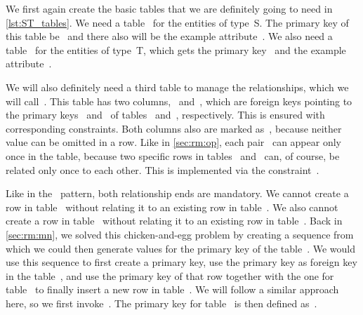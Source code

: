 We first again create the basic tables that we are definitely going to need in \cref{lst:ST_tables}.
We need a table~ for the entities of type~S.
The primary key of this table be~ and there also will be the example attribute~.
We also need a table~ for the entities of type~T, which gets the primary key~ and the example attribute~.%
%
\begin{sloppypar}%
We will also definitely need a third table to manage the relationships, which we will call~.
This table has two columns,~ and~, which are foreign keys pointing to the primary keys~ and~ of tables~ and~, respectively.
This is ensured with corresponding  constraints.
Both columns also are marked as~, because neither value can be omitted in a row.
Like in \cref{sec:rm:op}, each pair~ can appear only once in the table, because two specific rows in tables~ and~ can, of course, be related only once to each other.
This is implemented via the constraint~.%
\end{sloppypar}%
%
Like in the ~pattern, both relationship ends are mandatory.
We cannot create a row in table~ without relating it to an existing row in table~.
We also cannot create a row in table~ without relating it to an existing row in table~.
Back in \cref{sec:rm:mn}, we solved this chicken-and-egg problem by creating a sequence from which we could then generate values for the primary key of the table~.
We would use this sequence to first create a primary key, use the primary key as foreign key in the table~, and use the primary key of that row together with the one for table~ to finally insert a new row in table~.
We will follow a similar approach here, so we first invoke~.
The primary key for table~ is then defined as~.

